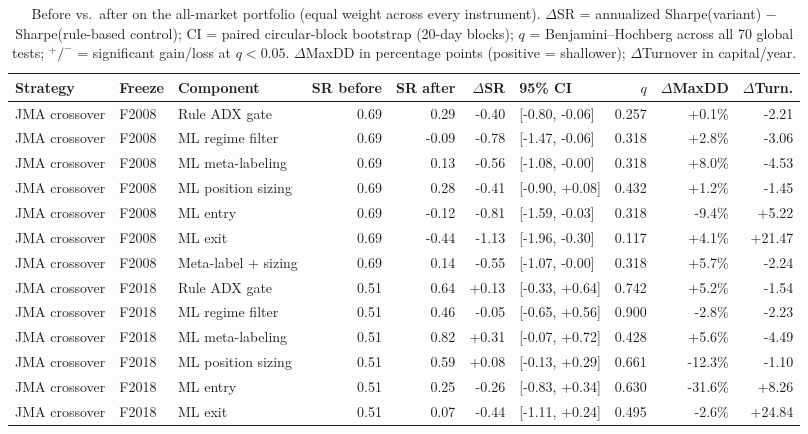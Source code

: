 \begin{longtable}{p{2.4cm} l p{2.5cm} r r r l r r r}
\caption{Before vs.\ after on the all-market portfolio (equal weight across every instrument). $\Delta$SR = annualized Sharpe(variant) $-$ Sharpe(rule-based control); CI = paired circular-block bootstrap (20-day blocks); $q$ = Benjamini--Hochberg across all 70 global tests; $^{+}/^{-}$ = significant gain/loss at $q<0.05$. $\Delta$MaxDD in percentage points (positive = shallower); $\Delta$Turnover in capital/year.} \label{tab:s2headline} \\
\toprule
Strategy & Freeze & Component & SR before & SR after & $\Delta$SR & 95\% CI & $q$ & $\Delta$MaxDD & $\Delta$Turn. \\
\midrule
\endhead
\bottomrule
\endfoot
JMA crossover & F2008 & Rule ADX gate & 0.69 & 0.29 & -0.40 & [-0.80, -0.06] & 0.257 & +0.1\% & -2.21 \\
JMA crossover & F2008 & ML regime filter & 0.69 & -0.09 & -0.78 & [-1.47, -0.06] & 0.318 & +2.8\% & -3.06 \\
JMA crossover & F2008 & ML meta-labeling & 0.69 & 0.13 & -0.56 & [-1.08, -0.00] & 0.318 & +8.0\% & -4.53 \\
JMA crossover & F2008 & ML position sizing & 0.69 & 0.28 & -0.41 & [-0.90, +0.08] & 0.432 & +1.2\% & -1.45 \\
JMA crossover & F2008 & ML entry & 0.69 & -0.12 & -0.81 & [-1.59, -0.03] & 0.318 & -9.4\% & +5.22 \\
JMA crossover & F2008 & ML exit & 0.69 & -0.44 & -1.13 & [-1.96, -0.30] & 0.117 & +4.1\% & +21.47 \\
JMA crossover & F2008 & Meta-label + sizing & 0.69 & 0.14 & -0.55 & [-1.07, -0.00] & 0.318 & +5.7\% & -2.24 \\
JMA crossover & F2018 & Rule ADX gate & 0.51 & 0.64 & +0.13 & [-0.33, +0.64] & 0.742 & +5.2\% & -1.54 \\
JMA crossover & F2018 & ML regime filter & 0.51 & 0.46 & -0.05 & [-0.65, +0.56] & 0.900 & -2.8\% & -2.23 \\
JMA crossover & F2018 & ML meta-labeling & 0.51 & 0.82 & +0.31 & [-0.07, +0.72] & 0.428 & +5.6\% & -4.49 \\
JMA crossover & F2018 & ML position sizing & 0.51 & 0.59 & +0.08 & [-0.13, +0.29] & 0.661 & -12.3\% & -1.10 \\
JMA crossover & F2018 & ML entry & 0.51 & 0.25 & -0.26 & [-0.83, +0.34] & 0.630 & -31.6\% & +8.26 \\
JMA crossover & F2018 & ML exit & 0.51 & 0.07 & -0.44 & [-1.11, +0.24] & 0.495 & -2.6\% & +24.84 \\

\end{longtable}

